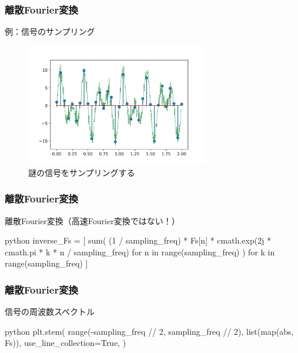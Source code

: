 \documentclass[dvipdfmx,11pt,notheorems]{beamer}
\theoremstyle{definition}
\begin{document}
\begin{frame}[fragile]\frametitle{離散Fourier変換}

\begin{block}{例：信号のサンプリング}
\begin{figure}
  \centering
  \includegraphics[width=8cm]{sampling.png}
  \caption{謎の信号をサンプリングする}
\end{figure}

\end{block}
\end{frame}

\begin{frame}[fragile]\frametitle{離散Fourier変換}
\begin{exampleblock}{離散Fourier変換（高速Fourier変換ではない！）}
\begin{pygments}{python}
inverse_Fs = [
    sum(
        (1 / sampling_freq)
        * Fs[n]
        * cmath.exp(2j * cmath.pi * k * n / sampling_freq)
        for n in range(sampling_freq)
    )
    for k in range(sampling_freq)
]
\end{pygments}
\end{exampleblock}

\end{frame}

\begin{frame}[fragile]\frametitle{離散Fourier変換}
\begin{exampleblock}{信号の周波数スペクトル}
\begin{pygments}{python}
plt.stem(
    range(-sampling_freq // 2, sampling_freq // 2),
    list(map(abs, Fs)),
    use_line_collection=True,
)
\end{pygments}
\end{exampleblock}

\end{frame}
\end{document}
